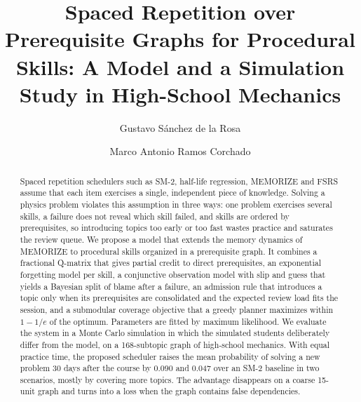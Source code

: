 \documentclass[runningheads]{llncs}
\begin{document}
%
\title{Spaced Repetition over Prerequisite Graphs for Procedural Skills: A Model and a Simulation Study in High-School Mechanics}
%
%
\author{Gustavo S\'anchez de la Rosa \and
Marco Antonio Ramos Corchado}
%
%
%
\maketitle
%
\begin{abstract}
Spaced repetition schedulers such as SM-2, half-life regression, MEMORIZE and FSRS assume that each item exercises a single, independent piece of knowledge. Solving a physics problem violates this assumption in three ways: one problem exercises several skills, a failure does not reveal which skill failed, and skills are ordered by prerequisites, so introducing topics too early or too fast wastes practice and saturates the review queue. We propose a model that extends the memory dynamics of MEMORIZE to procedural skills organized in a prerequisite graph. It combines a fractional Q-matrix that gives partial credit to direct prerequisites, an exponential forgetting model per skill, a conjunctive observation model with slip and guess that yields a Bayesian split of blame after a failure, an admission rule that introduces a topic only when its prerequisites are consolidated and the expected review load fits the session, and a submodular coverage objective that a greedy planner maximizes within $1-1/e$ of the optimum. Parameters are fitted by maximum likelihood. We evaluate the system in a Monte Carlo simulation in which the simulated students deliberately differ from the model, on a 168-subtopic graph of high-school mechanics. With equal practice time, the proposed scheduler raises the mean probability of solving a new problem 30 days after the course by 0.090 and 0.047 over an SM-2 baseline in two scenarios, mostly by covering more topics. The advantage disappears on a coarse 15-unit graph and turns into a loss when the graph contains false dependencies.

\end{abstract}

\end{document}
